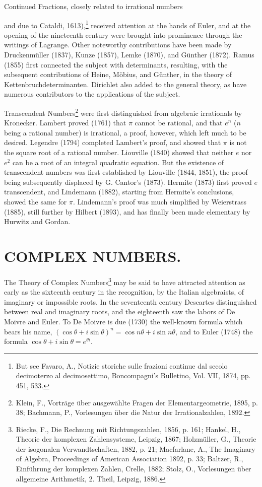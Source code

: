 \documentclass[oneside]{book}
\begin{document}
Continued Fractions, closely related to irrational numbers {and due
to Ca\-tal\-di, 1613),\footnote{But see Favaro, A., Notizie storiche
sulle frazioni continue dal secolo decimoterzo al decimosettimo,
Boncompagni's Bulletino, Vol. VII, 1874, pp. 451, 533.} received
attention at the hands of Euler, and at the opening of the
nineteenth century were brought into prominence through the writings
of Lagrange. Other noteworthy contributions have been made by
Druckenm\"uller (1837), Kunze (1857), Lemke (1870), and G\"unther
(1872). Ramus (1855) first connected the subject with determinants,
resulting, with the subsequent contributions of Heine, M\"obius, and
G\"unther, in the theory of Kettenbruchdeterminanten. Dirichlet
also added to the general theory, as have numerous contributors to
the applications of the subject.

Transcendent Numbers\footnote{Klein, F., Vortr\"age \"uber
ausgew\"ahlte Fragen der Elementargeometrie, 1895, p. 38; Bachmann,
P., Vorlesungen \"uber die Natur der Irrationalzahlen, 1892.} were
first distinguished from algebraic irrationals by
Kronecker. Lambert proved (1761) that $\pi$ cannot be rational, and
that $e^n$ ($n$ being a rational number) is irrational, a proof,
however, which left much to be desired. Legendre (1794) completed
Lambert's proof, and showed that $\pi$ is not the square root of a
rational number. Liouville (1840) showed that neither $e$ nor
$e^2$ can be a root of an integral quadratic equation. But the
existence of transcendent numbers was first established by Liouville
(1844, 1851), the proof being subsequently displaced by G. Cantor's
(1873). Hermite (1873) first proved $e$ transcendent, and Lindemann
(1882), starting from Hermite's conclusions, showed the same for
$\pi$. Lindemann's proof was much simplified by Weierstrass (1885),
still further by Hilbert (1893), and has finally been made
elementary by Hurwitz and Gordan.

\chapter{COMPLEX NUMBERS.}

The Theory of Complex Numbers\footnote{Riecke, F., Die Rechnung mit
Richtungszahlen, 1856, p. 161; Hankel, H., Theorie der komplexen
Zahlensysteme, Leipzig, 1867; Holzm\"uller, G., Theorie der
isogonalen Verwandtschaften, 1882, p. 21; Macfarlane, A., The
Imaginary of Algebra, Proceedings of American Association 1892,
p. 33; Baltzer, R., Einf\"uhrung der komplexen Zahlen, Crelle, 1882;
Stolz, O., Vorlesungen \"uber allgemeine Arithmetik, 2. Theil,
Leipzig, 1886.} may be said to have attracted attention as early as
the sixteenth century in the recognition, by the Italian
algebraists, of imaginary or impossible roots. In the seventeenth
century Descartes distinguished between real and imaginary roots,
and the eighteenth saw the labors of De Moivre and Euler. To De
Moivre is due (1730) the well-known formula which bears his name,
$(\cos \theta + i \sin
\theta)^{n} = \cos n \theta + i \sin n \theta$, and to Euler (1748)
the formula $\cos \theta + i \sin \theta = e ^{\theta i}$.

}
\end{document}
